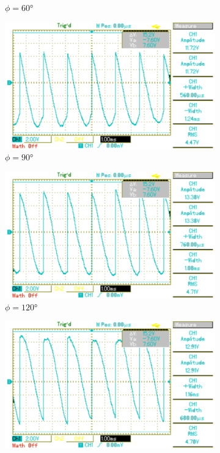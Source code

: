 \begin{figure}[p]
\begin{subfigure}{0.32\textwidth}
		\caption{$\phi=60°$}
	\end{subfigure}
	\begin{subfigure}{0.32\textwidth}
		\includegraphics[width=\textwidth]{Bilder/MAP021.pdf}
		\caption{$\phi=90°$}
	\end{subfigure}
	\begin{subfigure}{0.32\textwidth}
		\includegraphics[width=\textwidth]{Bilder/MAP022.pdf}
		\caption{$\phi=120°$}
	\end{subfigure}
	\begin{subfigure}{0.32\textwidth}
		\includegraphics[width=\textwidth]{Bilder/MAP023.pdf}

\end{subfigure}
\end{figure}
